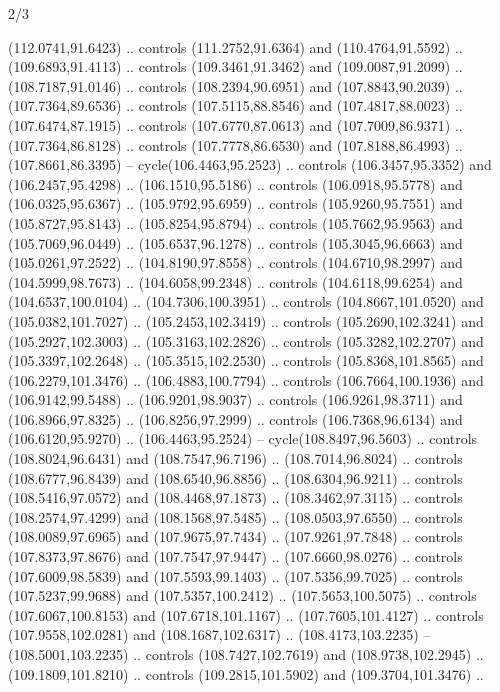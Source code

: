 \begin{flagdescription}{2/3}
\begin{scope}[shift={(0.5\flaglength,0.5)},scale=\flagwidth/320]
\begin{scope}[y=0.8pt, x=0.8pt, yscale=-1,shift={(-118.3,-146)}]
  (112.0741,91.6423) .. controls (111.2752,91.6364) and (110.4764,91.5592) ..
  (109.6893,91.4113) .. controls (109.3461,91.3462) and (109.0087,91.2099) ..
  (108.7187,91.0146) .. controls (108.2394,90.6951) and (107.8843,90.2039) ..
  (107.7364,89.6536) .. controls (107.5115,88.8546) and (107.4817,88.0023) ..
  (107.6474,87.1915) .. controls (107.6770,87.0613) and (107.7009,86.9371) ..
  (107.7364,86.8128) .. controls (107.7778,86.6530) and (107.8188,86.4993) ..
  (107.8661,86.3395) -- cycle(106.4463,95.2523) .. controls (106.3457,95.3352)
  and (106.2457,95.4298) .. (106.1510,95.5186) .. controls (106.0918,95.5778)
  and (106.0325,95.6367) .. (105.9792,95.6959) .. controls (105.9260,95.7551)
  and (105.8727,95.8143) .. (105.8254,95.8794) .. controls (105.7662,95.9563)
  and (105.7069,96.0449) .. (105.6537,96.1278) .. controls (105.3045,96.6663)
  and (105.0261,97.2522) .. (104.8190,97.8558) .. controls (104.6710,98.2997)
  and (104.5999,98.7673) .. (104.6058,99.2348) .. controls (104.6118,99.6254)
  and (104.6537,100.0104) .. (104.7306,100.3951) .. controls (104.8667,101.0520)
  and (105.0382,101.7027) .. (105.2453,102.3419) .. controls (105.2690,102.3241)
  and (105.2927,102.3003) .. (105.3163,102.2826) .. controls (105.3282,102.2707)
  and (105.3397,102.2648) .. (105.3515,102.2530) .. controls (105.8368,101.8565)
  and (106.2279,101.3476) .. (106.4883,100.7794) .. controls (106.7664,100.1936)
  and (106.9142,99.5488) .. (106.9201,98.9037) .. controls (106.9261,98.3711)
  and (106.8966,97.8325) .. (106.8256,97.2999) .. controls (106.7368,96.6134)
  and (106.6120,95.9270) .. (106.4463,95.2524) -- cycle(108.8497,96.5603) ..
  controls (108.8024,96.6431) and (108.7547,96.7196) .. (108.7014,96.8024) ..
  controls (108.6777,96.8439) and (108.6540,96.8856) .. (108.6304,96.9211) ..
  controls (108.5416,97.0572) and (108.4468,97.1873) .. (108.3462,97.3115) ..
  controls (108.2574,97.4299) and (108.1568,97.5485) .. (108.0503,97.6550) ..
  controls (108.0089,97.6965) and (107.9675,97.7434) .. (107.9261,97.7848) ..
  controls (107.8373,97.8676) and (107.7547,97.9447) .. (107.6660,98.0276) ..
  controls (107.6009,98.5839) and (107.5593,99.1403) .. (107.5356,99.7025) ..
  controls (107.5237,99.9688) and (107.5357,100.2412) .. (107.5653,100.5075) ..
  controls (107.6067,100.8153) and (107.6718,101.1167) .. (107.7605,101.4127) ..
  controls (107.9558,102.0281) and (108.1687,102.6317) .. (108.4173,103.2235) --
  (108.5001,103.2235) .. controls (108.7427,102.7619) and (108.9738,102.2945) ..
  (109.1809,101.8210) .. controls (109.2815,101.5902) and (109.3704,101.3476) ..

\end{scope}
\end{scope}
\end{flagdescription}
